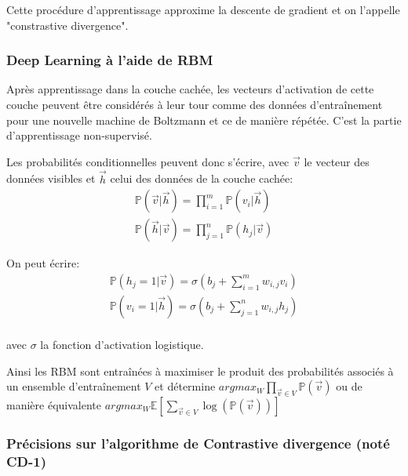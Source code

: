 \documentclass{article}
\theoremstyle{definition}
\begin{document}
\noindent Cette procédure d'apprentissage approxime la descente de gradient et on l'appelle "constrastive divergence".

\subsubsection{Deep Learning à l'aide de RBM}


\noindent Après apprentissage dans la couche cachée, les vecteurs d'activation de cette couche peuvent être considérés à leur tour comme des données d'entraînement pour une nouvelle machine de Boltzmann et ce de manière répétée. C'est la partie d'apprentissage non-supervisé.

\noindent Les probabilités conditionnelles peuvent donc s'écrire, avec $\vec{v}$ le vecteur des données visibles et $\vec{h}$ celui des données de la couche cachée:
\begin{align*}
\mathbb{P}(\vec{v}|\vec{h})=\prod_{i=1}^m \mathbb{P}(v_i|\vec{h})\\
\mathbb{P}(\vec{h}|\vec{v})=\prod_{j=1}^n \mathbb{P}(h_j|\vec{v})
\end{align*}

\noindent On peut écrire:
\begin{align*}
\mathbb{P}(h_j=1|\vec{v})=\sigma\left(b_j+\sum_{i=1}^m w_{i,j} v_i\right)\\
\mathbb{P}(v_i=1|\vec{h})=\sigma\left(b_j+\sum_{j=1}^n w_{i,j} h_j\right)\\
\end{align*}

\noindent avec $\sigma$ la fonction d'activation logistique.

\noindent Ainsi les RBM sont entraînées à maximiser le produit des probabilités associés à un ensemble d'entraînement $V$ et détermine $argmax_W \prod_{\vec{v}\in V}\mathbb{P}(\vec{v})$ ou de manière équivalente $argmax_W \mathbb{E}\left[\sum_{\vec{v}\in V} \log\left(\mathbb{P}(\vec{v})\right)\right]$

\subsubsection{Précisions sur l'algorithme de Contrastive divergence (noté CD-1)}
\end{document}
